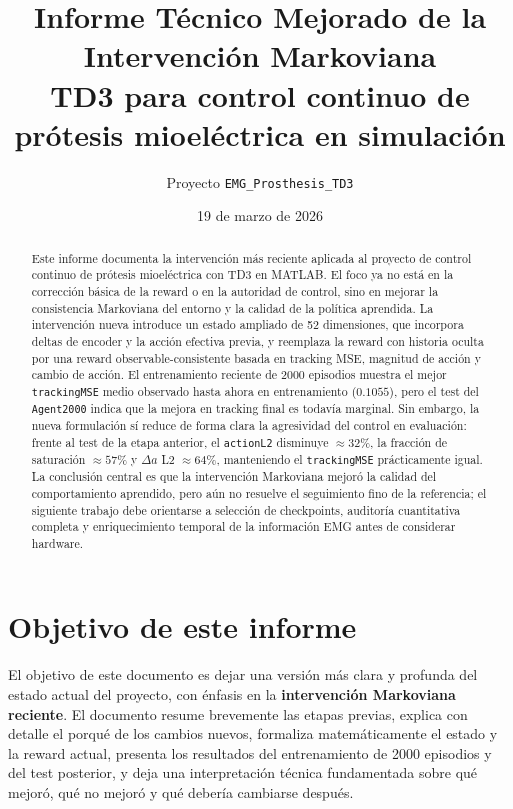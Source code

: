 \documentclass[11pt,a4paper]{article}
\title{\textbf{Informe T\'ecnico Mejorado de la Intervenci\'on Markoviana}\\
\large TD3 para control continuo de pr\'otesis mioel\'ectrica en simulaci\'on}
\author{Proyecto \texttt{EMG\_Prosthesis\_TD3}}
\date{19 de marzo de 2026}
\begin{document}
\maketitle

\begin{abstract}
Este informe documenta la intervenci\'on m\'as reciente aplicada al proyecto de control continuo de pr\'otesis mioel\'ectrica con TD3 en MATLAB. El foco ya no est\'a en la correcci\'on b\'asica de la reward o en la autoridad de control, sino en mejorar la consistencia Markoviana del entorno y la calidad de la pol\'itica aprendida. La intervenci\'on nueva introduce un estado ampliado de 52 dimensiones, que incorpora deltas de encoder y la acci\'on efectiva previa, y reemplaza la reward con historia oculta por una reward observable-consistente basada en tracking MSE, magnitud de acci\'on y cambio de acci\'on. El entrenamiento reciente de 2000 episodios muestra el mejor \texttt{trackingMSE} medio observado hasta ahora en entrenamiento (\(0.1055\)), pero el test del \texttt{Agent2000} indica que la mejora en tracking final es todav\'ia marginal. Sin embargo, la nueva formulaci\'on s\'i reduce de forma clara la agresividad del control en evaluaci\'on: frente al test de la etapa anterior, el \texttt{actionL2} disminuye \(\approx 32\%\), la fracci\'on de saturaci\'on \(\approx 57\%\) y \(\Delta a\) L2 \(\approx 64\%\), manteniendo el \texttt{trackingMSE} pr\'acticamente igual. La conclusi\'on central es que la intervenci\'on Markoviana mejor\'o la calidad del comportamiento aprendido, pero a\'un no resuelve el seguimiento fino de la referencia; el siguiente trabajo debe orientarse a selecci\'on de checkpoints, auditor\'ia cuantitativa completa y enriquecimiento temporal de la informaci\'on EMG antes de considerar hardware.
\end{abstract}

\section{Objetivo de este informe}

El objetivo de este documento es dejar una versi\'on m\'as clara y profunda del estado actual del proyecto, con \'enfasis en la \textbf{intervenci\'on Markoviana reciente}. El documento resume brevemente las etapas previas, explica con detalle el porqu\'e de los cambios nuevos, formaliza matem\'aticamente el estado y la reward actual, presenta los resultados del entrenamiento de 2000 episodios y del test posterior, y deja una interpretaci\'on t\'ecnica fundamentada sobre qu\'e mejor\'o, qu\'e no mejor\'o y qu\'e deber\'ia cambiarse despu\'es.
\end{document}
